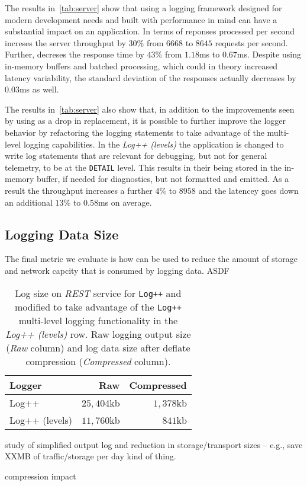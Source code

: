 The results in~\autoref{tab:server} show that using a logging framework designed 
for modern development needs and built with performance in mind can have a 
substantial impact on an application. In terms of reponses processed per second 
\projn increses the server throughput by $30\%$ from $6668$ to $8645$ requests 
per second. Further, \projn decreses the response time by $43\%$ 
from $1.18$ms to $0.67$ms. Despite using in-memory buffers and batched processing, 
which could in theory increased latency variability, the standard deviation of 
the responses actually decreases by $0.03$ms as well.

The results in~\autoref{tab:server} also show that, in addition to the improvements 
seen by using \projn as a drop in replacement, it is possible to further improve the 
logger behavior by refactoring the logging statements to take advantage of the 
multi-level logging capabilities. In the \emph{Log++ (levels)} the application is 
changed to write log statements that are relevant for debugging, but not for general 
telemetry, to be at the \texttt{DETAIL} level. This results in their being stored in 
the in-memory buffer, if needed for diagnostics, but not formatted and emitted. As 
a result the throughput increases a further $4\%$ to $8958$ and the latencey goes 
down an additional $13\%$ to $0.58$ms on average.

\subsection{Logging Data Size}
The final metric we evaluate is how \projn can be used to reduce the amount of 
storage and network capcity that is consumed by logging data. ASDF

\begin{table}[t]  
    \centering
    {\small
    \begin{tabular}{l | r r }
    Logger        & Raw & Compressed \\
    \hline
    Log++          & $25,404$kb & $1,378$kb \\
    Log++ (levels) & $11,760$kb & $841$kb   \\
    \end{tabular}
    }
    \vspace{2mm}
    \caption{Log size on \emph{REST} service for \texttt{Log++}
    and modified to take advantage of the \texttt{Log++} 
    multi-level logging functionality in the \emph{Log++ (levels)} row. Raw 
    logging output size (\emph{Raw} column) and log data size after deflate 
    compression (\emph{Compressed} column).}
    \label{tab:compress}
\end{table}

study of simplified output log and reduction in storage/transport sizes -- 
e.g., save XXMB of traffic/storage per day kind of thing.

compression impact
